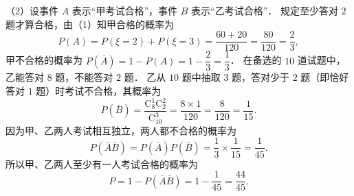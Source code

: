 \begin{answer}
（2）设事件 $A$ 表示“甲考试合格”，事件 $B$ 表示“乙考试合格”．
规定至少答对 $2$ 题才算合格，由（1）知甲合格的概率为
\nopagebreak[4]
\[
P(A) = P(\xi = 2) + P(\xi = 3) = \frac{60 + 20}{120} = \frac{80}{120} = \frac{2}{3},
\]
甲不合格的概率为 $P(\bar{A}) = 1 - P(A) = 1 - \dfrac{2}{3} = \dfrac{1}{3}$．
在备选的 $10$ 道试题中，乙能答对 $8$ 题，不能答对 $2$ 题．
乙从 $10$ 题中抽取 $3$ 题，答对少于 $2$ 题（即恰好答对 $1$ 题）时考试不合格，其概率为
\nopagebreak[4]
\[
P(\bar{B}) = \frac{\mathrm{C}_8^1 \mathrm{C}_2^2}{\mathrm{C}_{10}^3} = \frac{8 \times 1}{120} = \frac{8}{120} = \frac{1}{15}.
\]
因为甲、乙两人考试相互独立，两人都不合格的概率为
\nopagebreak[4]
\[
P(\bar{A}\bar{B}) = P(\bar{A}) P(\bar{B}) = \frac{1}{3} \times \frac{1}{15} = \frac{1}{45}.
\]
所以甲、乙两人至少有一人考试合格的概率为
\nopagebreak[4]
\[
P = 1 - P(\bar{A}\bar{B}) = 1 - \frac{1}{45} = \frac{44}{45}.
\]


\end{answer}
